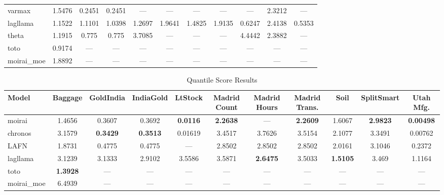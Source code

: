 \begin{table}
\begin{adjustbox}{width=0.95\textheight,center}
\begin{tabular}{lcccccccccc}
varmax & 1.5476 & 0.2451 & 0.2451 & --- & --- & --- & --- & --- & 2.3212 & --- \\
lagllama & 1.1522 & 1.1101 & 1.0398 & 1.2697 & 1.9641 & 1.4825 & 1.9135 & 0.6247 & 2.4138 & 0.5353 \\
theta & 1.1915 & 0.775 & 0.775 & 3.7085 & --- & --- & --- & 4.4442 & 2.3882 & --- \\
toto & 0.9174 & --- & --- & --- & --- & --- & --- & --- & --- & --- \\
moirai\_moe & 1.8892 & --- & --- & --- & --- & --- & --- & --- & --- & --- \\
\bottomrule
\end{tabular}
\end{adjustbox}
\end{table}

\begin{table}
\centering
\caption{Quantile Score Results}
\label{tab:quantile_score}
\begin{adjustbox}{width=0.95\textheight,center}
\small
\begin{tabular}{lcccccccccc}
\toprule
Model & Baggage & GoldIndia & IndiaGold & LtStock & Madrid Count & Madrid Hours & Madrid Trans. & Soil & SplitSmart & Utah Mfg. \\
\midrule
moirai & 1.4656 & 0.3607 & 0.3692 & \textbf{0.0116} & \textbf{2.2638} & --- & \textbf{2.2609} & 1.6067 & \textbf{2.9823} & \textbf{0.00498} \\
chronos & 3.1579 & \textbf{0.3429} & \textbf{0.3513} & 0.01619 & 3.4517 & 3.7626 & 3.5154 & 2.1077 & 3.3491 & 0.00762 \\
LAFN & 1.8731 & 0.4775 & 0.4775 & --- & 2.8502 & 2.8502 & 2.8502 & 2.0161 & 3.1046 & 0.2372 \\
lagllama & 3.1239 & 3.1333 & 2.9102 & 3.5586 & 3.5871 & \textbf{2.6475} & 3.5033 & \textbf{1.5105} & 3.469 & 1.1164 \\
toto & \textbf{1.3928} & --- & --- & --- & --- & --- & --- & --- & --- & --- \\
moirai\_moe & 6.4939 & --- & --- & --- & --- & --- & --- & --- & --- & --- \\
\bottomrule
\end{tabular}
\end{adjustbox}
\end{table}

